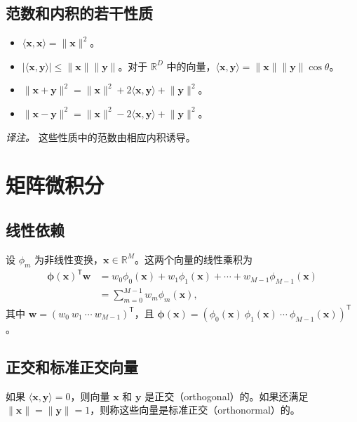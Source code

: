 \subsection{范数和内积的若干性质}
\begin{itemize}
\item $\langle\mathbf{x},\mathbf{x}\rangle=\lVert\mathbf{x}\rVert^2$。
\item $|\langle\mathbf{x},\mathbf{y}\rangle|\le\lVert\mathbf{x}\rVert\lVert\mathbf{y}\rVert$。对于 $\mathbb{R}^D$ 中的向量，$\langle\mathbf{x},\mathbf{y}\rangle=\lVert\mathbf{x}\rVert\lVert\mathbf{y}\rVert\cos\theta$。
\item $\lVert\mathbf{x}+\mathbf{y}\rVert^2=\lVert\mathbf{x}\rVert^2+2\langle\mathbf{x},\mathbf{y}\rangle+\lVert\mathbf{y}\rVert^2$。
\item $\lVert\mathbf{x}-\mathbf{y}\rVert^2=\lVert\mathbf{x}\rVert^2-2\langle\mathbf{x},\mathbf{y}\rangle+\lVert\mathbf{y}\rVert^2$。
\end{itemize}
\emph{译注。} 这些性质中的范数由相应内积诱导。

\section{矩阵微积分}
\subsection{线性依赖}
设 $\phi_m$ 为非线性变换，$\mathbf{x}\in\mathbb{R}^M$。这两个向量的线性乘积为
\[
\begin{aligned}
\boldsymbol{\phi}(\mathbf{x})^{\mathsf T}\mathbf{w}
 &=w_0\phi_0(\mathbf{x})+w_1\phi_1(\mathbf{x})
    +\cdots+w_{M-1}\phi_{M-1}(\mathbf{x})\\
 &=\sum_{m=0}^{M-1}w_m\phi_m(\mathbf{x}),
\end{aligned}
\]
其中 $\mathbf{w}=(w_0\ w_1\ \cdots\ w_{M-1})^{\mathsf T}$，且 $\boldsymbol{\phi}(\mathbf{x})=(\phi_0(\mathbf{x})\ \phi_1(\mathbf{x})\ \cdots\ \phi_{M-1}(\mathbf{x}))^{\mathsf T}$。

\subsection{正交和标准正交向量}
如果 $\langle\mathbf{x},\mathbf{y}\rangle=0$，则向量 $\mathbf{x}$ 和 $\mathbf{y}$ 是正交（orthogonal）的。如果还满足 $\lVert\mathbf{x}\rVert=\lVert\mathbf{y}\rVert=1$，则称这些向量是标准正交（orthonormal）的。

